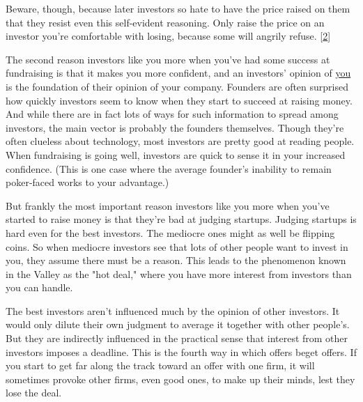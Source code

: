 Beware, though, because later investors so hate
                    to have the price raised on them that they resist even this
                    self-evident reasoning. Only raise the price on an investor
                    you're comfortable with losing, because some will angrily
                    refuse.
                    [\href{\#f2n}{2}]

The second reason investors like you more when
                    you've had some success at fundraising is that it makes you
                    more confident, and an investors' opinion of
                    \href{http://www.paulgraham.com/convince.html}{you} is the foundation of their
                    opinion of your company. Founders are often surprised how
                    quickly investors seem to know when they start to succeed at
                    raising money. And while there are in fact lots of ways for
                    such information to spread among investors, the main vector
                    is probably the founders themselves. Though they're often
                    clueless about technology, most investors are pretty good at
                    reading people. When fundraising is going well, investors
                    are quick to sense it in your increased confidence. (This is
                    one case where the average founder's inability to remain
                    poker-faced works to your advantage.)

But frankly
                    the most important reason investors like you more when
                    you've started to raise money is that they're bad at judging
                    startups. Judging startups is hard even for the best
                    investors. The mediocre ones might as well be flipping
                    coins. So when mediocre investors see that lots of other
                    people want to invest in you, they assume there must be a
                    reason. This leads to the phenomenon known in the Valley as
                    the "hot deal," where you have more interest from investors
                    than you can handle.

The best investors aren't
                    influenced much by the opinion of other investors. It would
                    only dilute their own judgment to average it together with
                    other people's. But they are indirectly influenced in the
                    practical sense that interest from other investors imposes a
                    deadline. This is the fourth way in which offers beget
                    offers. If you start to get far along the track toward an
                    offer with one firm, it will sometimes provoke other firms,
                    even good ones, to make up their minds, lest they lose the
                    deal.

